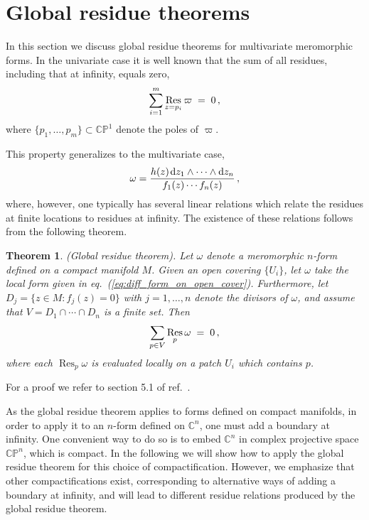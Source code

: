 \documentclass[dvipsnames,preprint,12pt,sort&compress]{elsarticle}
\newtheorem{theorem}{Theorem}
\def\d{{\rm d}}
\begin{document}
\section{Global residue theorems}\label{sec:global_residue_thm}

In this section we discuss global residue theorems for multivariate meromorphic
forms. In the univariate case it is well known that the sum of all residues,
including that at infinity, equals zero,
\begin{equation}
\sum_{i=1}^m \mathop{\mathrm{Res}}_{z=p_i} \varpi \hspace{1mm}=\hspace{1mm} 0 \,,
\end{equation}
where $\{p_1, \ldots, p_m\} \subset \mathbb{CP}^1$ denote the poles of $\varpi$.

This property generalizes to the multivariate case,
\begin{align}
\omega = \frac{h(z) \hspace{0.4mm} \d z_1\wedge\cdots\wedge \d z_n}{f_1(z)\cdots f_n(z)}\,,
\label{eq:diff_form_on_open_cover}
\end{align}
where, however, one typically has several linear relations which relate the residues
at finite locations to residues at infinity. The existence of these relations
follows from the following theorem.

\clearpage

\begin{theorem}\label{thm:global_residue_thm}
(Global residue theorem). Let $\omega$ denote a meromorphic $n$-form defined
on a compact manifold $M$. Given an open covering $\{ U_i \}$, let $\omega$ take the local
form given in eq.~\textup{(\ref{eq:diff_form_on_open_cover})}.
Furthermore, let $D_j = \{ z \in M : f_j (z) = 0\}$ with $j=1,\ldots, n$
denote the divisors of $\omega$, and assume that $V = D_1 \cap \cdots \cap D_n$
is a finite set. Then
\begin{equation}
\sum_{p \in V} \mathop{\mathrm{Res}}_{p} \omega \hspace{1mm}=\hspace{1mm} 0 \,,
\label{eq:global_residue_thm}
\end{equation}
where each $\mathop{\mathrm{Res}}_{p} \omega$ is evaluated locally on a patch $U_i$
which contains $p$.
\end{theorem}

For a proof we refer to section 5.1 of ref.~\cite{GriffithsHarris}.

As the global residue theorem applies to forms defined on compact manifolds,
in order to apply it to an $n$-form defined on $\mathbb{C}^n$,
one must add a boundary at infinity. One convenient way to do so is to embed
$\mathbb{C}^n$ in complex projective space $\mathbb{CP}^n$, which is compact.
In the following we will show how to apply the global residue theorem
for this choice of compactification. However, we emphasize that other
compactifications exist, corresponding to alternative ways of adding
a boundary at infinity, and will lead to different residue relations
produced by the global residue theorem.
\end{document}
